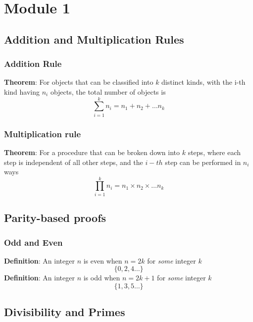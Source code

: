 \chapter{Module 1}

\section{Addition and Multiplication Rules}

\subsection{Addition Rule}
\begin{framed}
   \textbf{Theorem}: For objects that can be classified into $k$ distinct kinds, with the i-th kind having $n_i$ objects, the total number of objects is
   \[
      \sum_{i=1}^{k} n_i = n_1 + n_2 + \hdots n_k
   \] 
\end{framed}


\subsection{Multiplication rule}
\begin{framed}
   \textbf{Theorem}: For a procedure that can be broken down into $k$ steps, where each step is independent of all other steps, and the $i-th$ step can be performed in $n_i$ ways
   \[
      \prod_{i=1}^{k} n_i = n_1 \times n_2 \times \hdots n_k
   \] 
\end{framed}

\section{Parity-based proofs}

\subsection{Odd and Even}
\begin{framed}
   \textbf{Definition}: An integer $n$ is even when $n = 2k$ for \textit{some} integer $k$
   \[
     \{ 0, 2, 4 \hdots \} 
   \] 
   \textbf{Definition}: An integer $n$ is odd when $n = 2k + 1$ for \textit{some} integer $k$
   \[
     \{ 1, 3, 5 \hdots \} 
   \] 
\end{framed}

\section{Divisibility and Primes}

